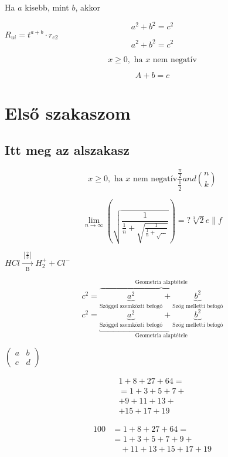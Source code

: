 \documentclass[a4paper]{article}
\begin{document}
Ha $a$ kisebb, mint $b$, akkor

\[
a^2+b^2=c^2
\]
$R_{ui}=t^{a+b}\cdot r_{e2}$
\begin{equation}
a^2+b^2=c^2
\end{equation}

\[
x \geq 0, \textrm{ ha $x$ nem negatív}
\]

 \begin{equation}
\label{eq:emeletes}
A+b=c
\end{equation}

\section{Első szakaszom}
\subsection{Itt meg az alszakasz}
\begin{equation}
x \geq 0, \textrm{ ha $x$ nem negatív}
\frac{\frac{\pi}{2}}{\frac{1}{2}} and {n \choose k}
\end{equation}

\begin{equation}
\label{eq:emeletes}
\lim_{n \to \infty} \left( \sqrt {
\frac 1 { \frac 1 n + \sqrt {
\frac 1 { \frac 1 n + \sqrt {
\dots }}}}} \right) = ?
\sqrt[3]{2} e \parallel f
\end{equation}

$HCl\overset{\left[\frac{2}{3}\right]}
{\underset{\mathrm{B}}{\rightarrow}}H^+_2+Cl^-$

\[
c^2 = \overbrace{
\underbrace{a^2}_\text{Szöggel szemközti befogó} +
\underbrace{b^2}_\text{Szög melletti befogó}
}^\text{Geometria alaptétele}
\]
\[
c^2 = \underbracket{
\underbrace{a^2}_\text{Szöggel szemközti befogó} +
\underbrace{b^2}_\text{Szög melletti befogó}
}_\text{Geometria alaptétele}
\]

$\begin{pmatrix} a&b\\ c&d \end{pmatrix}$

\begin{multline}\label{címke}
1+8+27+64=\\
=1+3+5+7+{}\\
+9+11+13+{}\\
+15+17+19
\end{multline}

\begin{equation}\label
{cimke}
\begin{split}
100 &=1+8+27+64=\\
&=1+3+5+7+9+{}\\
&\quad+11+13+15+17+19
\end{split}\tag*{A-1}
\end{equation}
\end{document}
